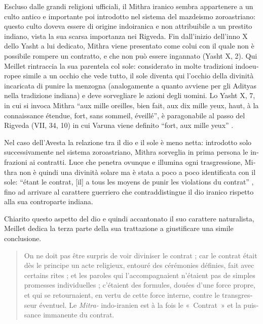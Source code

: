 \documentclass[output=paper]{../langscibook}
\begin{document}
\begin{otherlanguage}{italian}
Escluso dalle grandi religioni ufficiali, il Mithra iranico sembra appartenere a un culto antico e importante poi introdotto nel sistema del mazdeismo zoroastriano: questo culto doveva essere di origine indoiranica e non attribuibile a un prestito indiano, vista la sua scarsa importanza nei Rigveda. 
Fin dall'inizio dell’inno X dello Yasht a lui dedicato, Mithra viene presentato come colui con il quale non è possibile rompere un contratto, e che non può essere ingannato (Yasht X, 2). Qui Meillet rintraccia la sua parentela col sole: considerato in molte tradizioni indoeuropee simile a un occhio che vede tutto, il sole diventa qui l’occhio della divinità incaricata di punire la menzogna (analogamente a quanto avviene per gli Adityas nella tradizione indiana) e deve sorvegliare le azioni degli uomini. Lo Yasht X, 7, in cui si invoca Mithra “aux mille oreilles, bien fait, aux dix mille yeux, haut, à la connaissance étendue, fort, sans sommeil, éveillé”, è paragonabile al passo del Rigveda (VII, 34, 10) in cui Varuna viene definito “fort, aux mille yeux” \citep[150]{meillet_dieu_1907-1}.

Nel caso dell’Avesta la relazione tra il dio e il sole è meno netta: introdotto solo successivamente nel sistema zoroastriano, Mithra sorveglia in prima persona le infrazioni ai contratti. Luce che penetra ovunque e illumina ogni trasgressione, Mithra non è quindi una divinità solare ma è stata a poco a poco identificata con il sole: “étant le contrat, [il] a tous les moyens de punir les violations du contrat” \citep[153]{meillet_dieu_1907-1}, fino ad arrivare al carattere guerriero che contraddistingue il dio iranico rispetto alla sua controparte indiana.

Chiarito questo aspetto del dio e quindi accantonato il suo carattere naturalista, Meillet dedica la terza parte della sua trattazione a giustificare una simile conclusione. 

\begin{quote}
    On ne doit pas être surpris de voir diviniser le contrat ; car le contrat était dès le principe un acte religieux, entouré des cérémonies définies, fait avec certains rites ; et les paroles qui l’accompagnaient n’étaient pas de simples promesses individuelles ; c’étaient des formules, douées d’une force propre, et qui se retournaient, en vertu de cette force interne, contre le transgresseur éventuel. Le \textit{Mitra-} indo-iranien est à la fois le «~Contrat~» et la puissance immanente du contrat. \citep[156]{meillet_dieu_1907-1}
\end{quote}


\end{otherlanguage}
\end{document}
